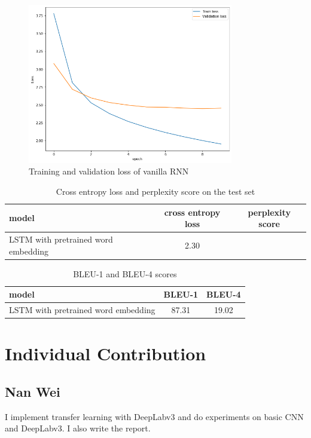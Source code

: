 \documentclass{article} %
\begin{document}
\begin{figure}[htb!]
    \centering
     \includegraphics[width=0.8\textwidth]{LSTM_pretrainedloss}
    \caption{Training and validation loss of vanilla RNN}
    \label{LSTM_pre_loss}
\end{figure}
\begin{table}[!htb]
    \caption{Cross entropy loss and perplexity score on the test set}
    \label{celoss}
    \centering
    \begin{tabular}{l|c|c|}
        \hline
        model & cross entropy loss & perplexity score \\
		\hline
		LSTM with pretrained word embedding&2.30&\\
	    \hline
    \end{tabular}
\end{table}
\begin{table}[!htb]
    \caption{BLEU-1 and BLEU-4 scores}
    \label{bleu}
    \centering
    \begin{tabular}{l|c|c|}
        \hline
        model & BLEU-1 & BLEU-4 \\
		\hline
		LSTM with pretrained word embedding&87.31&19.02\\
	    \hline
    \end{tabular}
\end{table}


\section{Individual Contribution}

\subsection*{Nan Wei}
I implement transfer learning with DeepLabv3 and do experiments on basic CNN and DeepLabv3. I also write the report.
\end{document}

